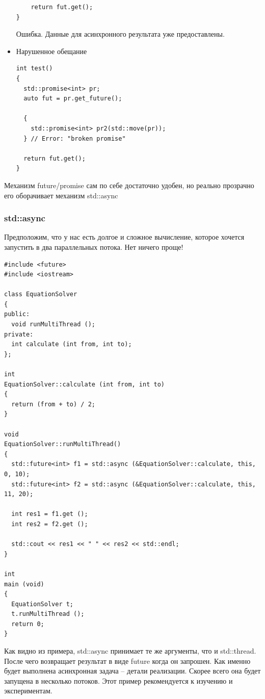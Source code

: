 \documentclass[a4paper,12pt,oneside]{article}
\begin{document}
\begin{itemize}
\begin{lstlisting}
    return fut.get();
}
\end{lstlisting}

Ошибка. Данные для асинхронного результата уже предоставлены.

\item Нарушенное обещание
\begin{lstlisting}
int test()
{
  std::promise<int> pr;
  auto fut = pr.get_future();

  {
    std::promise<int> pr2(std::move(pr));
  } // Error: "broken promise"

  return fut.get();
}
\end{lstlisting}

\end{itemize}

Механизм future/promise сам по себе достаточно удобен, но реально прозрачно его оборачивает механизм std::async

\subsubsection{std::async}

Предположим, что у нас есть долгое и сложное вычисление, которое хочется запустить в два параллельных потока. Нет ничего проще!

\begin{lstlisting}
#include <future>
#include <iostream>

class EquationSolver
{
public:
  void runMultiThread ();
private:
  int calculate (int from, int to);  
};

int 
EquationSolver::calculate (int from, int to)
{
  return (from + to) / 2;
}

void 
EquationSolver::runMultiThread()
{
  std::future<int> f1 = std::async (&EquationSolver::calculate, this,  0, 10);
  std::future<int> f2 = std::async (&EquationSolver::calculate, this, 11, 20);

  int res1 = f1.get ();
  int res2 = f2.get ();

  std::cout << res1 << " " << res2 << std::endl;
}

int
main (void)
{
  EquationSolver t;
  t.runMultiThread ();
  return 0;
}
\end{lstlisting}

Как видно из примера, std::async принимает те же аргументы, что и std::thread. После чего возвращает результат в виде future когда он запрошен. Как именно будет выполнена асинхронная задача -- детали реализации. Скорее всего она будет запущена в несколько потоков.
Этот пример рекомендуется к изучению и экспериментам.
\end{document}
